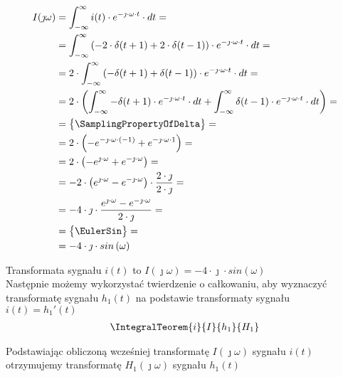 \begin{task}
\begin{align*}
I(\jmath \omega )&=\int_{-\infty }^{\infty}i(t) \cdot e^{-\jmath \cdot \omega \cdot t}\cdot dt=\\
&=\int_{-\infty }^{\infty}\left( -2 \cdot \delta(t+1) + 2 \cdot \delta(t-1)\right) \cdot e^{-\jmath \cdot \omega \cdot t}\cdot dt=\\
&=2 \cdot \int_{-\infty }^{\infty} \left( -\delta(t+1) + \delta(t-1) \right) \cdot e^{-\jmath \cdot \omega \cdot t}\cdot dt=\\
&=2 \cdot \left( \int_{-\infty }^{\infty} -\delta(t+1) \cdot e^{-\jmath \cdot \omega \cdot t}\cdot dt + \int_{-\infty }^{\infty} \delta(t-1) \cdot e^{-\jmath \cdot \omega \cdot t}\cdot dt \right)=\\
&=\begin{Bmatrix}
\SamplingPropertyOfDelta
\end{Bmatrix}=\\
&= 2 \cdot \left( -e^{-\jmath \cdot \omega \cdot (-1)} + e^{-\jmath \cdot \omega \cdot 1} \right)=\\
&= 2 \cdot \left( -e^{\jmath \cdot \omega} + e^{-\jmath \cdot \omega} \right)=\\
&= -2 \cdot \left( e^{\jmath \cdot \omega} - e^{-\jmath \cdot \omega} \right) \cdot \frac{2 \cdot \jmath}{2 \cdot \jmath}=\\
&= -4 \cdot \jmath \cdot \frac{ e^{\jmath \cdot \omega} - e^{-\jmath \cdot \omega} }{2 \cdot \jmath} =\\
&=\begin{Bmatrix}
\EulerSin
\end{Bmatrix}=\\
&= -4 \cdot \jmath \cdot sin\left( \omega\right) 
\end{align*}

Transformata sygnału $i(t)$ to $I(\jmath \omega)=-4 \cdot \jmath \cdot sin\left( \omega\right)$
\\

Następnie możemy wykorzystać twierdzenie o całkowaniu, aby wyznaczyć transformatę sygnału $h_1(t)$ na podstawie transformaty sygnału $i(t)=h_1'(t)$
\begin{align*}
\IntegralTeorem{i}{I}{h_1}{H_1}
\end{align*}

Podstawiając obliczoną wcześniej transformatę $I(\jmath \omega)$ sygnału $i(t)$ otrzymujemy transformatę $H_1(\jmath \omega)$ sygnału $h_1(t)$


\end{task}
